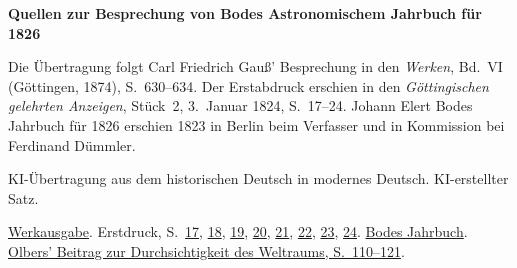 \clearpage\thispagestyle{empty}
\begin{center}\Large\bfseries Quellen zur Besprechung von Bodes Astronomischem Jahrbuch für 1826\end{center}

Die Übertragung folgt Carl Friedrich Gauß’ Besprechung in den \emph{Werken}, Bd.~VI (Göttingen, 1874), S.~630--634. Der Erstabdruck erschien in den \emph{Göttingischen gelehrten Anzeigen}, Stück~2, 3.~Januar 1824, S.~17--24. Johann Elert Bodes Jahrbuch für 1826 erschien 1823 in Berlin beim Verfasser und in Kommission bei Ferdinand Dümmler.

KI-Übertragung aus dem historischen Deutsch in modernes Deutsch. KI-erstellter Satz.

\href{https://gdz.sub.uni-goettingen.de/id/PPN236007467}{Werkausgabe}. Erstdruck, S.~\href{https://images.p.sub.uni-goettingen.de/iiif/image/gdz:PPN385030444_1824_1:00000019/full/1650,/0/default.jpg}{17}, \href{https://images.p.sub.uni-goettingen.de/iiif/image/gdz:PPN385030444_1824_1:00000020/full/1650,/0/default.jpg}{18}, \href{https://images.p.sub.uni-goettingen.de/iiif/image/gdz:PPN385030444_1824_1:00000021/full/1650,/0/default.jpg}{19}, \href{https://images.p.sub.uni-goettingen.de/iiif/image/gdz:PPN385030444_1824_1:00000022/full/1650,/0/default.jpg}{20}, \href{https://images.p.sub.uni-goettingen.de/iiif/image/gdz:PPN385030444_1824_1:00000023/full/1650,/0/default.jpg}{21}, \href{https://images.p.sub.uni-goettingen.de/iiif/image/gdz:PPN385030444_1824_1:00000024/full/1650,/0/default.jpg}{22}, \href{https://images.p.sub.uni-goettingen.de/iiif/image/gdz:PPN385030444_1824_1:00000025/full/1650,/0/default.jpg}{23}, \href{https://images.p.sub.uni-goettingen.de/iiif/image/gdz:PPN385030444_1824_1:00000026/full/1650,/0/default.jpg}{24}. \href{https://www.digitale-sammlungen.de/en/view/bsb10538355?page=3}{Bodes Jahrbuch}. \href{https://www.digitale-sammlungen.de/en/view/bsb10538355?page=116}{Olbers’ Beitrag zur Durchsichtigkeit des Weltraums, S.~110--121}.

\clearpage
